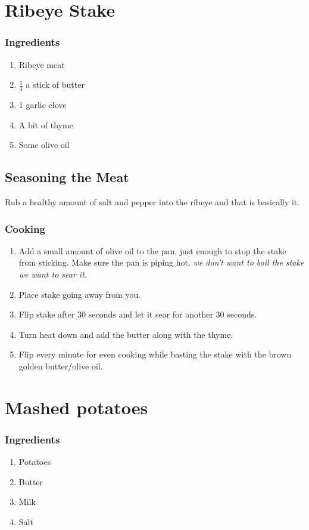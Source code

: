 \section{Ribeye Stake}
\subsubsection{Ingredients}
\begin{enumerate}
    \item Ribeye meat
    \item $\frac{1}{4}$ a stick of butter
    \item 1 garlic clove
    \item A bit of thyme
    \item Some olive oil
\end{enumerate}

\subsection{Seasoning the Meat}
Rub a healthy amount of salt and pepper into the ribeye and that is basically it.

\subsubsection{Cooking}
\begin{enumerate}
    \item Add a small amount of olive oil to the pan, just enough to stop the stake from sticking. Make sure the pan is piping hot. \textit{we don't want to boil the stake we want to sear it.}
    \item Place stake going away from you.
    \item Flip stake after 30 seconds and let it sear for another 30 seconds.
    \item Turn heat down and add the butter along with the thyme.
    \item Flip every minute for even cooking while basting the stake with the brown golden butter/olive oil.
\end{enumerate}

\section{Mashed potatoes}
\subsubsection{Ingredients}
\begin{enumerate}
    \item Potatoes
    \item Butter
    \item Milk
    \item Salt
\end{enumerate}

